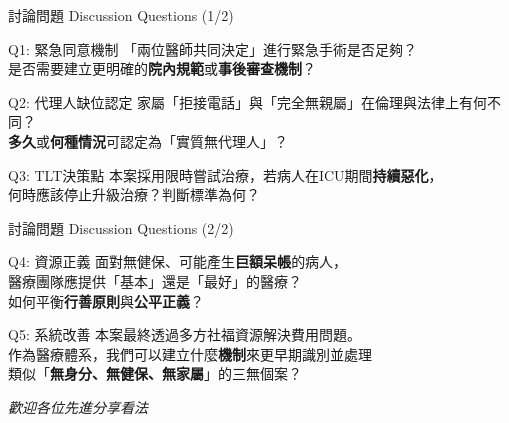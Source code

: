 \documentclass[aspectratio=169,12pt]{beamer}
\begin{document}
\begin{frame}{討論問題 Discussion Questions (1/2)}

\begin{alertblock}{Q1: 緊急同意機制}
「兩位醫師共同決定」進行緊急手術是否足夠？\\
是否需要建立更明確的\textbf{院內規範}或\textbf{事後審查機制}？
\end{alertblock}

\vspace{0.3cm}

\begin{alertblock}{Q2: 代理人缺位認定}
家屬「拒接電話」與「完全無親屬」在倫理與法律上有何不同？\\
\textbf{多久}或\textbf{何種情況}可認定為「實質無代理人」？
\end{alertblock}

\vspace{0.3cm}

\begin{alertblock}{Q3: TLT決策點}
本案採用限時嘗試治療，若病人在ICU期間\textbf{持續惡化}，\\
何時應該停止升級治療？判斷標準為何？
\end{alertblock}

\end{frame}

\begin{frame}{討論問題 Discussion Questions (2/2)}

\begin{alertblock}{Q4: 資源正義}
面對無健保、可能產生\textbf{巨額呆帳}的病人，\\
醫療團隊應提供「基本」還是「最好」的醫療？\\
如何平衡\textbf{行善原則}與\textbf{公平正義}？
\end{alertblock}

\vspace{0.5cm}

\begin{alertblock}{Q5: 系統改善}
本案最終透過多方社福資源解決費用問題。\\
作為醫療體系，我們可以建立什麼\textbf{機制}來更早期識別並處理\\
類似「\textbf{無身分、無健保、無家屬}」的三無個案？
\end{alertblock}

\vspace{0.5cm}
\centering
\textcolor{ntuhblue}{\large{\textit{歡迎各位先進分享看法}}}

\end{frame}
\end{document}
